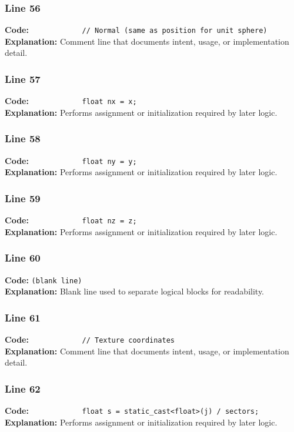 \documentclass[11pt,a4paper]{article}
\begin{document}
\subsubsection*{Line 56}
\textbf{Code:} \verb|            // Normal (same as position for unit sphere)|\\
\textbf{Explanation:} Comment line that documents intent, usage, or implementation detail.

\subsubsection*{Line 57}
\textbf{Code:} \verb|            float nx = x;|\\
\textbf{Explanation:} Performs assignment or initialization required by later logic.

\subsubsection*{Line 58}
\textbf{Code:} \verb|            float ny = y;|\\
\textbf{Explanation:} Performs assignment or initialization required by later logic.

\subsubsection*{Line 59}
\textbf{Code:} \verb|            float nz = z;|\\
\textbf{Explanation:} Performs assignment or initialization required by later logic.

\subsubsection*{Line 60}
\textbf{Code:} \texttt{(blank line)}\\
\textbf{Explanation:} Blank line used to separate logical blocks for readability.

\subsubsection*{Line 61}
\textbf{Code:} \verb|            // Texture coordinates|\\
\textbf{Explanation:} Comment line that documents intent, usage, or implementation detail.

\subsubsection*{Line 62}
\textbf{Code:} \verb|            float s = static_cast<float>(j) / sectors;|\\
\textbf{Explanation:} Performs assignment or initialization required by later logic.
\end{document}
